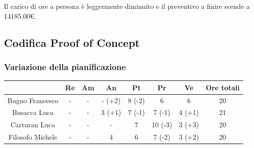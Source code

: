 Il carico di ore a persona è leggermente diminuito e il preventivo a finire scende a 14185,00€.

\pagebreak

\subsection{Codifica Proof of Concept} \label{subsection:consuntivo_PoC}
\subsubsection{Variazione della pianificazione} \label{subsubsection:variazione_pianificazione_PoC}

\begin{table}[H]
  \centering
  \renewcommand{\arraystretch}{1.8}
  \begin{tabular}{c|c|c|c|c|c|c|c}
    \rowcolor[HTML]{125E28}
    \multicolumn{1}{c}{\color[HTML]{FFFFFF}\textbf{ Nominativo }}
                         & \multicolumn{1}{c}{\color[HTML]{FFFFFF}\textbf{ Re }}
                         & \multicolumn{1}{c}{\color[HTML]{FFFFFF}\textbf{ Am}}
                         & \multicolumn{1}{c}{\color[HTML]{FFFFFF}\textbf{ An }}
                         & \multicolumn{1}{c}{\color[HTML]{FFFFFF}\textbf{ Pt }}
                         & \multicolumn{1}{c}{\color[HTML]{FFFFFF}\textbf{ Pr }}
                         & \multicolumn{1}{c}{\color[HTML]{FFFFFF}\textbf{ Ve }}
                         & \multicolumn{1}{c}{\color[HTML]{FFFFFF}\textbf{ Ore totali }}                                                                                                             \\
    \hline
    Bugno Francesco      & -                                                             & -          & - (+2)          & 8 (-2)           & 6                & 6                & 20                \\
    Busacca Luca         & -                                                             & -          & 3 (+1)          & 7 (-1)           & 7 (-1)           & 4 (+1)           & 21                \\
    Carturan Luca        & -                                                             & -          & -               & 7                & 10 (-3)          & 3 (+3)           & 20                \\
    Filosofo Michele     & -                                                             & -          & 4               & 6                & 7 (-2)           & 3 (+2)           & 20                \\

\end{tabular}
\end{table}
